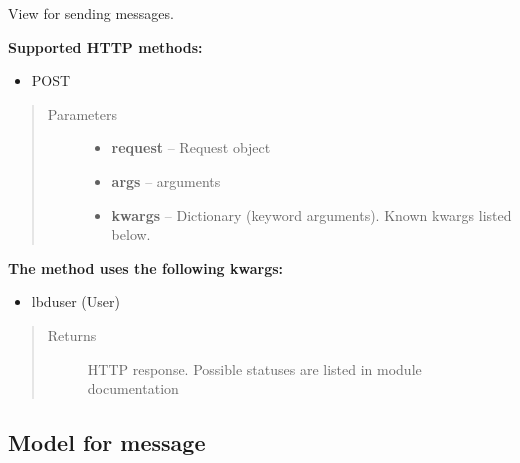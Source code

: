 \documentclass[letterpaper,10pt,english]{sphinxmanual}
\begin{document}

\begin{fulllineitems}
\label{codedoc/msgdoc:lbd_backend.LBD_REST_messagedata.views.msg_send}
View for sending messages.

\textbf{Supported HTTP methods:}
\begin{itemize}
\item {} 
POST

\end{itemize}
\begin{quote}\begin{description}
\item[{Parameters}] \leavevmode\begin{itemize}
\item {} 
\textbf{request} -- Request object

\item {} 
\textbf{args} -- arguments

\item {} 
\textbf{kwargs} -- Dictionary (keyword arguments). Known kwargs listed below.

\end{itemize}

\end{description}\end{quote}

\textbf{The method uses the following kwargs:}
\begin{itemize}
\item {} 
lbduser (User)

\end{itemize}
\begin{quote}\begin{description}
\item[{Returns}] \leavevmode
HTTP response. Possible statuses are listed in module documentation

\end{description}\end{quote}

\end{fulllineitems}

\label{codedoc/msgdoc:module-lbd_backend.LBD_REST_messagedata.models}

\subsection{Model for message}
\label{codedoc/msgdoc:module-MessagedataREST.models}\label{codedoc/msgdoc:model-for-message}
\end{document}

